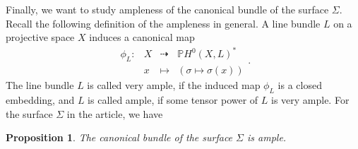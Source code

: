 \documentclass{article}
\newtheorem{proposition}[theorem]{Proposition}
\theoremstyle{definition}
\begin{document}







Finally, we want to study ampleness of the canonical bundle of the surface $\Sigma$. Recall the following definition of the ampleness in general. A line bundle $L$ on a projective space $X$ induces a canonical map
\[
\begin{array}{cccc}
  \phi_L: & X & \dashrightarrow & \mathbb PH^0(X, L)^*\\
   & x & \mapsto & (\sigma\mapsto \sigma(x))
\end{array}.
\] The line bundle $L$ is called very ample, if the induced map $\phi_L$ is a closed embedding, and $L$ is called ample, if some tensor power of $L$ is very ample. For the surface $\Sigma$ in the article, we have
\begin{proposition} 
    The canonical bundle of the surface $\Sigma$ is ample.
\end{proposition}
\end{document}
